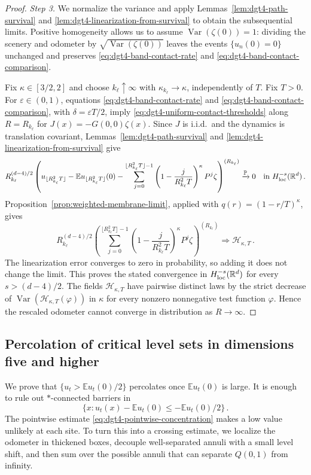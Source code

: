 \documentclass[11pt]{amsart}
\theoremstyle{plain}
\theoremstyle{definition}
\newcommand{\R}{\mathbb{R}}
\newcommand{\E}{\mathbb{E}}
\renewcommand{\P}{\mathbb{P}}
\DeclareMathOperator{\Var}{Var}
\begin{document}
\begin{proof}
	\par\smallskip\noindent\emph{Step 3.} We normalize the variance and apply
	Lemmas~\ref{lem:dgt4-path-survival} and
	\ref{lem:dgt4-linearization-from-survival} to obtain the subsequential
	limits.
	Positive homogeneity allows us to assume $\Var(\zeta(0))=1$: dividing the
	scenery and odometer by $\sqrt{\Var(\zeta(0))}$ leaves the events
	$\{u_n(0)=0\}$ unchanged and preserves \eqref{eq:dgt4-band-contact-rate} and
	\eqref{eq:dgt4-band-contact-comparison}.

	Fix $\kappa\in[3/2,2]$ and choose $k_\ell\uparrow\infty$ with
	$\kappa_{k_\ell}\to\kappa$, independently of $T$. Fix $T>0$. For
	$\varepsilon\in(0,1)$, equations
	\eqref{eq:dgt4-band-contact-rate} and
	\eqref{eq:dgt4-band-contact-comparison}, with
	$\delta=\varepsilon T/2$, imply
	\eqref{eq:dgt4-uniform-contact-thresholds} along
	$R=R_{k_\ell}$ for $J(x)=-G(0,0)\zeta(x)$.
	Since $J$ is i.i.d.\ and the dynamics is translation covariant,
	Lemmas~\ref{lem:dgt4-path-survival} and
	\ref{lem:dgt4-linearization-from-survival} give
	\[
	R_{k_\ell}^{(d-4)/2}
	\left(
	u_{\lfloor R_{k_\ell}^2T\rfloor}-
	\E u_{\lfloor R_{k_\ell}^2T\rfloor}(0)
	-
	\sum_{j=0}^{\lfloor R_{k_\ell}^2T\rfloor-1}
	\left(1-\frac{j}{R_{k_\ell}^2T}\right)^\kappa P^j\zeta
	\right)^{(R_{k_\ell})}
	\xrightarrow{\P}0
	\quad\text{in }H^{-s}_{\rm loc}(\R^d)\, .
	\]
	Proposition~\ref{prop:weighted-membrane-limit}, applied with
	$q(r)=(1-r/T)^\kappa$, gives
	\[
		R_{k_\ell}^{(d-4)/2}
		\left(
		\sum_{j=0}^{\lfloor R_{k_\ell}^2T\rfloor-1}
		\left(1-\frac{j}{R_{k_\ell}^2T}\right)^\kappa P^j\zeta
		\right)^{(R_{k_\ell})}
		\Longrightarrow\mathcal H_{\kappa,T}\, .
	\]
	The linearization error converges to zero in probability, so adding it does
	not change the limit. This proves the stated convergence in
	$H^{-s}_{\rm loc}(\R^d)$ for every $s>(d-4)/2$.
	The fields $\mathcal H_{\kappa,T}$ have pairwise distinct laws by the strict decrease of
	$\Var(\mathcal H_{\kappa,T}(\varphi))$ in $\kappa$ for every nonzero nonnegative test
	function $\varphi$. Hence the rescaled odometer
	cannot converge in distribution as $R\to\infty$.
\end{proof}
	\subsection{Percolation of critical level sets in dimensions five and higher}\label{sec:high-d-nontriviality}
		We prove that 
		$\{u_t>\E u_t(0)/2\}$ percolates once $\E u_t(0)$ is large. It is
		enough to rule out $\ast$-connected barriers in
		\[
			\{x:u_t(x)-\E u_t(0)\leq-\E u_t(0)/2\}\, .
		\]
		The pointwise estimate \eqref{eq:dgt4-pointwise-concentration} makes a low value unlikely at each site. To turn this into a crossing estimate,
		we localize the odometer in thickened boxes, decouple well-separated
		annuli with a small level shift, and then sum over the possible annuli
		that can separate $Q(0,1)$ from infinity.
\end{document}
